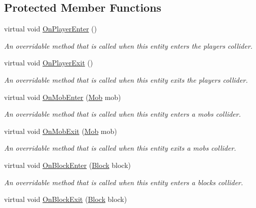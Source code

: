 \subsection*{Protected Member Functions}
\begin{DoxyCompactItemize}
\item 
virtual void \mbox{\hyperlink{class_entity_ad1e2bb09e463c33b64b26ba3306ba2d7}{On\+Player\+Enter}} ()
\begin{DoxyCompactList}\small\item\em An overridable method that is called when this entity enters the player\textquotesingle{}s collider. \end{DoxyCompactList}\item 
virtual void \mbox{\hyperlink{class_entity_a32971771be20c0e99a202911b6f311b3}{On\+Player\+Exit}} ()
\begin{DoxyCompactList}\small\item\em An overridable method that is called when this entity exits the player\textquotesingle{}s collider. \end{DoxyCompactList}\item 
virtual void \mbox{\hyperlink{class_entity_a92558812563a875ea0e6c3a781ab50bd}{On\+Mob\+Enter}} (\mbox{\hyperlink{class_mob}{Mob}} mob)
\begin{DoxyCompactList}\small\item\em An overridable method that is called when this entity enters a mob\textquotesingle{}s collider. \end{DoxyCompactList}\item 
virtual void \mbox{\hyperlink{class_entity_a6d53fa0672b1a366c8e7defd2e4503a6}{On\+Mob\+Exit}} (\mbox{\hyperlink{class_mob}{Mob}} mob)
\begin{DoxyCompactList}\small\item\em An overridable method that is called when this entity exits a mob\textquotesingle{}s collider. \end{DoxyCompactList}\item 
virtual void \mbox{\hyperlink{class_entity_a8c0a0d1bbee6bf816ff122f2ddfd8820}{On\+Block\+Enter}} (\mbox{\hyperlink{class_block}{Block}} block)
\begin{DoxyCompactList}\small\item\em An overridable method that is called when this entity enters a block\textquotesingle{}s collider. \end{DoxyCompactList}\item 
virtual void \mbox{\hyperlink{class_entity_a7d7bec05bad5f327b3265d3514948a5e}{On\+Block\+Exit}} (\mbox{\hyperlink{class_block}{Block}} block)

\end{DoxyCompactItemize}
